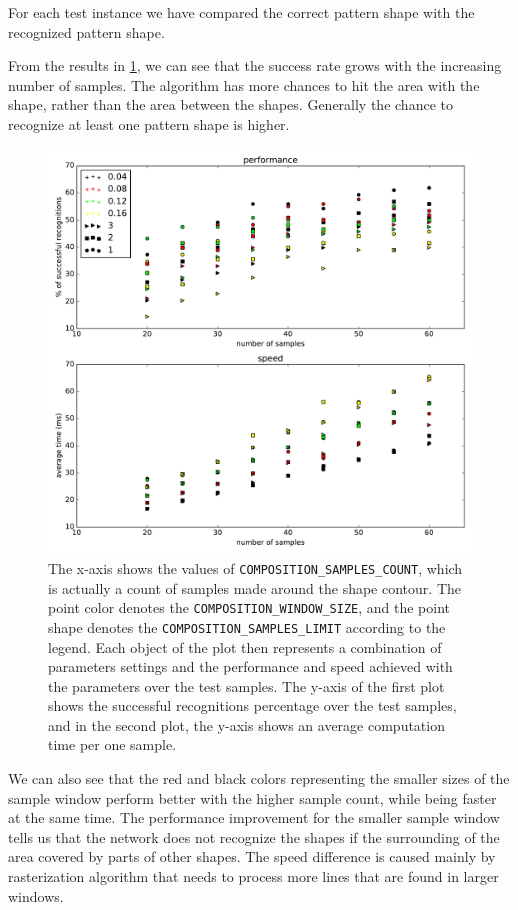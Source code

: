 For each test instance we have compared the correct pattern shape with the recognized pattern shape.

From the results in \cref{fig:com}, we can see that the success rate grows with the increasing number of samples. The algorithm has more chances to hit the area with the shape, rather than the area between the shapes. Generally the chance to recognize at least one pattern shape is higher.

\begin{figure}
\centering
\includegraphics[width=.8\linewidth]{ext/figure_composition_results.pdf}
\caption{The x-axis shows the values of \texttt{COMPOSITION\_SAMPLES\_COUNT}, which is actually a count of samples made around the shape contour. The point color denotes the \texttt{COMPOSITION\_WINDOW\_SIZE}, and the point shape denotes the \texttt{COMPOSITION\_SAMPLES\_LIMIT} according to the legend. Each object of the plot then represents a combination of parameters settings and the performance and speed achieved with the parameters over the test samples. The y-axis of the first plot shows the successful recognitions percentage over the test samples, and in the second plot, the y-axis shows an average computation time per one sample.}
\label{fig:com}
\end{figure}

We can also see that the red and black colors representing the smaller sizes of the sample window perform better with the higher sample count, while being faster at the same time. The performance improvement for the smaller sample window tells us that the network does not recognize the shapes if the surrounding of the area covered by parts of other shapes. The speed difference is caused mainly by rasterization algorithm that needs to process more lines that are found in larger windows.

